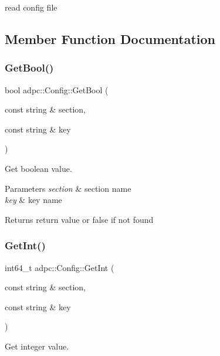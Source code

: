 read config file 

\subsection{Member Function Documentation}
\mbox{\label{classadpc_1_1Config_a42a33471c732cd4960e5fb3e00e3b433}} 
\subsubsection{\texorpdfstring{Get\+Bool()}{GetBool()}}
{\footnotesize\ttfamily bool adpc\+::\+Config\+::\+Get\+Bool (\begin{DoxyParamCaption}\item[{const string \&}]{section,  }\item[{const string \&}]{key }\end{DoxyParamCaption})}



Get boolean value. 


\begin{DoxyParams}{Parameters}
{\em section} & section name \\
\hline
{\em key} & key name \\
\hline
\end{DoxyParams}
\begin{DoxyReturn}{Returns}
return value or {\ttfamily false} if not found 
\end{DoxyReturn}
\mbox{\label{classadpc_1_1Config_a8153d1c7be58fa8ce1a6c768bd65ea94}} 
\subsubsection{\texorpdfstring{Get\+Int()}{GetInt()}}
{\footnotesize\ttfamily int64\+\_\+t adpc\+::\+Config\+::\+Get\+Int (\begin{DoxyParamCaption}\item[{const string \&}]{section,  }\item[{const string \&}]{key }\end{DoxyParamCaption})}



Get integer value. 


